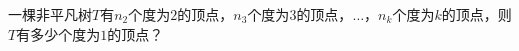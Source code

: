 \begin{Exercise}
  一棵非平凡树$T$有$n_2$个度为$2$的顶点，$n_3$个度为$3$的顶点，$\ldots$，$n_k$个度为$k$的顶点，则$T$有多少个度为$1$的顶点？
\end{Exercise}
